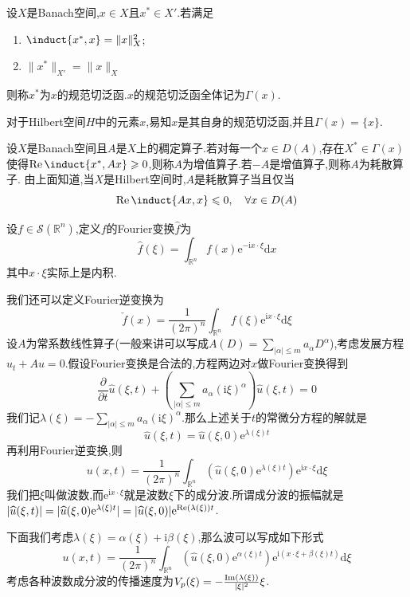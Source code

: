 设$X$是Banach空间,$x\in X$且$x^*\in X'$.若满足
\begin{enumerate}
    \item $\induct{x^*,x}=\|x\|^2_{X}$;
    \item $\|x^*\|_{X'}=\|x\|_{X}$
\end{enumerate}
则称$x^*$为$x$的规范切泛函.$x$的规范切泛函全体记为$\Gamma(x)$.\par
对于Hilbert空间$H$中的元素$x$,易知$x$是其自身的规范切泛函,并且$\Gamma(x)=\{x\}$.\par
设$X$是Banach空间且$A$是$X$上的稠定算子.若对每一个$x\in D(A)$,存在$X^*\in\Gamma (x)$使得$\re \induct{x^*,Ax}\geqslant 0$,则称$A$为增值算子.若$-A$是增值算子,则称$A$为耗散算子.
由上面知道,当$X$是Hilbert空间时,$A$是耗散算子当且仅当
$$
\re \induct{Ax,x}\leqslant 0,\quad \forall x\in D(A)
$$
\begin{Definition}{}
    设$f\in \mathcal{S}(\mathbb{R}^n)$,定义$f$的Fourier变换$\widehat{f}$为
    $$
    \widehat{f}(\xi)=\int_{\mathbb{R}^n}f(x)\mathrm{e}^{-\mathrm{i}x\cdot\xi}\mathrm{d}x
    $$
    其中$x\cdot\xi$实际上是内积.
\end{Definition}
我们还可以定义Fourier逆变换为
$$
\check{f}(x)=\frac{1}{(2\pi)^n} \int_{\mathbb{R}^n}f(\xi)\mathrm{e}^{\mathrm{i}x\cdot\xi}\mathrm{d}\xi
$$
设$A$为常系数线性算子(一般来讲可以写成$A(D)=\sum_{|\alpha|\leqslant m}a_{\alpha}D^{\alpha}$),考虑发展方程$u_t+Au=0$.假设Fourier变换是合法的,方程两边对$x$做Fourier变换得到
$$
\frac{\partial}{\partial t}\widehat{u}(\xi,t)+\left(\sum_{|\alpha|\leqslant m}a_{\alpha}(\mathrm{i}\xi)^{\alpha}\right)\widehat{u}(\xi,t)=0
$$
我们记$\lambda(\xi)=-\sum_{|\alpha|\leqslant m}a_{\alpha}(\mathrm{i}\xi)^{\alpha}$.那么上述关于$t$的常微分方程的解就是
$$
\widehat{u}(\xi,t)=\widehat{u}(\xi,0)\mathrm{e}^{\lambda(\xi)t}
$$
再利用Fourier逆变换,则
$$
u(x,t)=\frac{1}{(2\pi)^n} \int_{\mathbb{R}^n}\left(\widehat{u}(\xi,0)\mathrm{e}^{\lambda(\xi)t}\right)\mathrm{e}^{\mathrm{i}x\cdot\xi}\mathrm{d}\xi
$$
我们把$\xi$叫做波数,而$\mathrm{e}^{\mathrm{i}x\cdot\xi}$就是波数$\xi$下的成分波.所谓成分波的振幅就是$|\widehat{u}(\xi,t)|=|\widehat{u}(\xi,0)\mathrm{e}^{\lambda(\xi)t}|=|\widehat{u}(\xi,0)|\mathrm{e}^{\operatorname{Re}(\lambda(\xi))t}$.\par
下面我们考虑$\lambda(\xi)=\alpha(\xi)+\mathrm{i}\beta(\xi)$,那么波可以写成如下形式
$$
u(x,t)=\frac{1}{(2\pi)^n} \int_{\mathbb{R}^n}\left(\widehat{u}(\xi,0)\mathrm{e}^{\alpha(\xi)t}\right)\mathrm{e}^{\mathrm{i}(x\cdot\xi+\beta(\xi)t)}\mathrm{d}\xi
$$
考虑各种波数成分波的传播速度为$V_p(\xi)=-\frac{\operatorname{Im}(\lambda(\xi))}{|\xi|^2}\xi$.\par

















